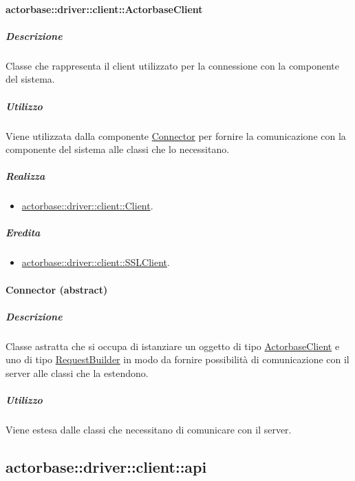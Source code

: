 \documentclass{scalatekids-article}
\begin{document}
\paragraph{actorbase::driver::client::ActorbaseClient}
\label{sec:actorbase::driver::client::ActorbaseClient}

\subparagraph{Descrizione}

Classe che rappresenta il client utilizzato per la connessione con la componente
 del sistema.

\subparagraph{Utilizzo}

Viene utilizzata dalla componente
\hyperref[sec:actorbase::driver::client::Connector]{Connector} per fornire la
comunicazione con la componente  del sistema alle classi che lo
necessitano.

\subparagraph{Realizza}

\begin{itemize}
\item \hyperref[sec:actorbase::driver::client::Client]{actorbase::driver::client::Client}.
\end{itemize}

\subparagraph{Eredita}

\begin{itemize}
\item \hyperref[sec:actorbase::driver::client::SSLClient]{actorbase::driver::client::SSLClient}.
\end{itemize}

\paragraph{Connector (abstract)}
\label{sec:actorbase::driver::client::Connector}

\subparagraph{Descrizione}

Classe astratta che si occupa di istanziare un oggetto di tipo
\hyperref[sec:actorbase::driver::client::ActorbaseClient]{ActorbaseClient} e uno
di tipo
\hyperref[sec:actorbase::driver::client::api::RequestBuilder]{RequestBuilder} in
modo da fornire possibilità di comunicazione con il server alle classi che la
estendono.

\subparagraph{Utilizzo}

Viene estesa dalle classi che necessitano di comunicare con il server.


\subsection{actorbase::driver::client::api}
\label{sec:actorbase::driver::client::api}
\end{document}
